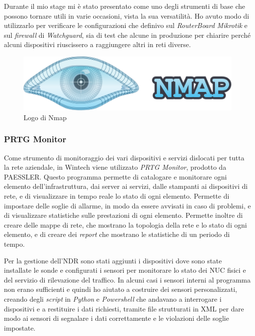 Durante il mio stage mi è stato presentato come uno degli strumenti di base che possono tornare utili in varie occasioni, vista la sua versatilità. Ho avuto modo di utilizzarlo per verificare le configurazioni che definivo sul \emph{RouterBoard Mikrotik} e sul \emph{firewall} di \emph{Watchguard}, sia di test che alcune in produzione per chiarire perché alcuni dispositivi riuscissero a raggiungere altri in reti diverse.

\begin{figure}[!htbp]
    \centering
    \includegraphics[width=0.6\linewidth]{images/loghi/nmap.png}
    \caption{Logo di Nmap}
    \label{fig:nmap-logo}
\end{figure}

\subsubsection{PRTG Monitor}

Come strumento di monitoraggio dei vari dispositivi e servizi dislocati per tutta la rete aziendale, in Wintech viene utilizzato \emph{PRTG Monitor}, prodotto da PAESSLER. Questo programma permette di catalogare e monitorare ogni elemento dell'infrastruttura, dai server ai servizi, dalle stampanti ai dispositivi di rete, e di visualizzare in tempo reale lo stato di ogni elemento. Permette di impostare delle soglie di allarme, in modo da essere avvisati in caso di problemi, e di visualizzare statistiche sulle prestazioni di ogni elemento. Permette inoltre di creare delle mappe di rete, che mostrano la topologia della rete e lo stato di ogni elemento, e di creare dei \emph{report} che mostrano le statistiche di un periodo di tempo.

Per la gestione dell'NDR sono stati aggiunti i dispositivi dove sono state installate le sonde e configurati i sensori per monitorare lo stato dei NUC fisici e del servizio di rilevazione del traffico. In alcuni casi i sensori interni al programma non erano sufficienti e quindi ho aiutato a costruire dei sensori personalizzati, creando degli \emph{script} in \emph{Python} e \emph{Powershell} che andavano a interrogare i dispositivi e a restituire i dati richiesti, tramite file strutturati in XML per dare modo ai sensori di segnalare i dati correttamente e le violazioni delle soglie impostate.

